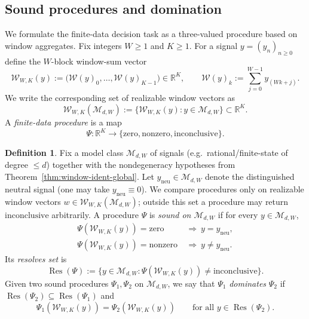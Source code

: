 \documentclass[11pt,reqno]{amsart}
\theoremstyle{definition}
\newtheorem{definition}[theorem]{Definition}
\theoremstyle{remark}
\newcommand{\R}{\mathbb{R}}
\newcommand{\1}{\mathbf{1}}
\newcommand{\zero}{\mathrm{zero}}
\newcommand{\nonzero}{\mathrm{nonzero}}
\newcommand{\inconclusive}{\mathrm{inconclusive}}
\begin{document}
\subsection{Sound procedures and domination}\label{subsec:domination}

We formulate the finite-data decision task as a three-valued procedure based on window aggregates.
Fix integers $W\ge 1$ and $K\ge 1$. For a signal $y=(y_n)_{n\ge 0}$ define the $W$-block window-sum
vector
\[
\mathcal{W}_{W,K}(y):=\big(\mathcal{W}(y)_0,\dots,\mathcal{W}(y)_{K-1}\big)\in\R^{K},
\qquad
\mathcal{W}(y)_k:=\sum_{j=0}^{W-1}y_{(Wk+j)}.
\]
We write the corresponding set of realizable window vectors as
\[
\mathcal{W}_{W,K}(\mathcal{M}_{d,W}):=\{\mathcal{W}_{W,K}(y):y\in\mathcal{M}_{d,W}\}\subset\R^{K}.
\]
A \emph{finite-data procedure} is a map
\[
\Psi:\R^{K}\to\{\zero,\nonzero,\inconclusive\}.
\]

\begin{definition}\label{def:domination}
Fix a model class $\mathcal{M}_{d,W}$ of signals (e.g.\ rational/finite-state of degree $\le d$) together with the
nondegeneracy hypotheses from Theorem~\ref{thm:window-ident-global}.
Let $y_{\mathrm{neu}}\in\mathcal{M}_{d,W}$ denote the distinguished neutral signal (one may take $y_{\mathrm{neu}}\equiv 0$).
We compare procedures only on realizable window vectors $w\in\mathcal{W}_{W,K}(\mathcal{M}_{d,W})$; outside this set a procedure may return $\inconclusive$ arbitrarily.
A procedure $\Psi$ is \emph{sound on $\mathcal{M}_{d,W}$} if for every $y\in\mathcal{M}_{d,W}$,
\begin{align*}
\Psi(\mathcal{W}_{W,K}(y))=\zero &\ \Longrightarrow\ y=y_{\mathrm{neu}},\\
\Psi(\mathcal{W}_{W,K}(y))=\nonzero &\ \Longrightarrow\ y\neq y_{\mathrm{neu}}.
\end{align*}
Its \emph{resolves set} is
\[
\operatorname{Res}(\Psi):=\{y\in\mathcal{M}_{d,W}:\Psi(\mathcal{W}_{W,K}(y))\neq \inconclusive\}.
\]
Given two sound procedures $\Psi_1,\Psi_2$ on $\mathcal{M}_{d,W}$, we say that $\Psi_1$ \emph{dominates} $\Psi_2$
if $\operatorname{Res}(\Psi_2)\subseteq \operatorname{Res}(\Psi_1)$ and
\[
\Psi_1(\mathcal{W}_{W,K}(y))=\Psi_2(\mathcal{W}_{W,K}(y))\qquad\text{for all }y\in \operatorname{Res}(\Psi_2).
\]
\end{definition}
\end{document}
